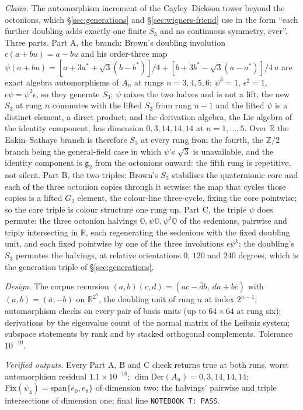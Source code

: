 \emph{Claim.} The automorphism increment of the Cayley--Dickson tower beyond the octonions, which
\S\ref{sec:generations} and \S\ref{sec:wigners-friend} use in the form ``each further doubling
adds exactly one finite $S_{3}$ and no continuous symmetry, ever''. Three parts. Part A, the
branch: Brown's doubling involution $\epsilon(a + bu) = a - bu$ and his order-three map
$\psi(a + bu) = [a + 3a^{*} + \sqrt3(b - b^{*})]/4 + [b + 3b^{*} - \sqrt3(a - a^{*})]/4\,u$ are
exact algebra automorphisms of $A_{n}$ at rungs $n = 3, 4, 5, 6$; $\psi^{3} = 1$,
$\epsilon^{2} = 1$, $\epsilon\psi = \psi^{2}\epsilon$, so they generate $S_{3}$; $\psi$ mixes the
two halves and is not a lift; the new $S_{3}$ at rung $n$ commutes with the lifted $S_{3}$ from
rung $n - 1$ and the lifted $\psi$ is a distinct element, a direct product; and the derivation
algebra, the Lie algebra of the identity component, has dimension $0, 3, 14, 14, 14$ at
$n = 1, \dots, 5$. Over $\mathbb{R}$ the Eakin--Sathaye branch is therefore $S_{3}$ at every rung
from the fourth, the $\mathbb{Z}/2$ branch being the general-field case in which $\psi$'s
$\sqrt3$ is unavailable, and the identity component is $\mathfrak{g}_{2}$ from the octonions
onward: the fifth rung is repetitive, not silent. Part B, the two triples: Brown's $S_{3}$
stabilises the quaternionic core and each of the three octonion copies through it setwise; the
map that cycles those copies is a lifted $G_{2}$ element, the colour-line three-cycle, fixing the
core pointwise; so the core triple is colour structure one rung up. Part C, the triple $\psi$ does
permute: the three octonion halvings $\mathbb{O}, \psi\mathbb{O}, \psi^{2}\mathbb{O}$ of the
sedenions, pairwise and triply intersecting in $\mathbb{R}$, each regenerating the sedenions with
the fixed doubling unit, and each fixed pointwise by one of the three involutions
$\epsilon\psi^{k}$; the doubling's $S_{3}$ permutes the halvings, at relative orientations
$0$, $120$ and $240$ degrees, which is the generation triple of \S\ref{sec:generations}.

\emph{Design.} The corpus recursion $(a,b)(c,d) = (ac - \bar d b,\ da + b\bar c)$ with
$\overline{(a,b)} = (\bar a, -b)$ on $\mathbb{R}^{2^{n}}$, the doubling unit of rung $n$ at index
$2^{n-1}$; automorphism checks on every pair of basis units (up to $64 \times 64$ at rung six);
derivations by the eigenvalue count of the normal matrix of the Leibniz system; subspace
statements by rank and by stacked orthogonal complements. Tolerance $10^{-10}$.

\emph{Verified outputs.} Every Part A, B and C check returns true at both runs, worst
automorphism residual $1.1 \times 10^{-16}$; $\dim\mathrm{Der}(A_{n}) = 0, 3, 14, 14, 14$;
$\mathrm{Fix}(\psi_{4}) = \mathrm{span}\{e_{0}, e_{8}\}$ of dimension two; the halvings' pairwise
and triple intersections of dimension one; final line \texttt{NOTEBOOK T: PASS}.

